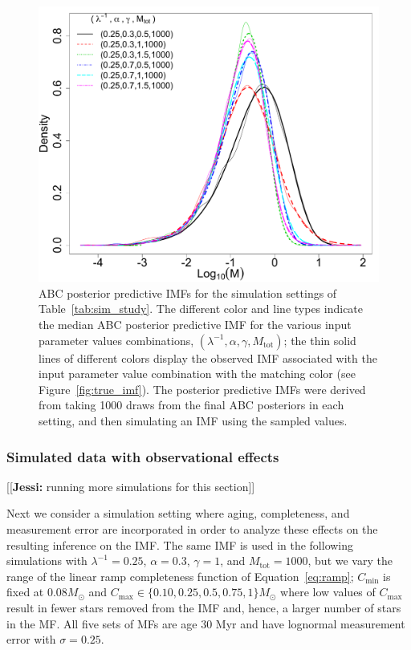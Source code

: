 \documentclass[12pt]{article}
\newcommand{\jessi}[1]{{\color{blue}[[\textbf{Jessi: }#1]]}}
\newcommand{\Msun}{M_{\odot}}
\newcommand{\Cmin}{C_{\text{min}}}
\newcommand{\Cmax}{C_{\text{max}}}
\newcommand{\Mtot}{M_{\text{tot}}}
\begin{document}
\begin{figure}[htbp]
   \centering
\includegraphics[width = .5\textwidth]{figures/sim_study_imf_combined.pdf} 
   \caption{ABC posterior predictive IMFs for the simulation settings of Table~\ref{tab:sim_study}.  The different color and line types indicate the median ABC posterior predictive IMF for the various input parameter values combinations, $(\lambda^{-1}, \alpha, \gamma, \Mtot)$; the thin solid lines of different colors display the observed IMF associated with the input parameter value combination with the matching color (see Figure~\ref{fig:true_imf}).
The posterior predictive IMFs were derived from taking 1000 draws from the final ABC posteriors in each setting, and then simulating an IMF using the sampled values. 
   }
   \label{fig:abc_pa_imf}
\end{figure}





\subsubsection{Simulated data with observational effects} \label{sec:sim_obs}

\jessi{running more simulations for this section}

Next we consider a simulation setting where aging, completeness, and measurement error are incorporated in order to analyze these effects on the resulting inference on the IMF.  The same IMF is used in the following simulations with $\lambda^{-1} = 0.25$, $\alpha = 0.3$, $\gamma = 1$, and $\Mtot = 1000$, but we vary the range of the linear ramp completeness function of Equation~\eqref{eq:ramp}; $\Cmin$ is fixed at 0.08$\Msun$ and $\Cmax \in \{0.10, 0.25, 0.5, 0.75, 1\} \Msun$ where low values of $\Cmax$ result in fewer stars removed from the IMF and, hence, a larger number of stars in the MF.  All five sets of MFs are age 30 Myr and have lognormal measurement error with $\sigma = 0.25$.  
\end{document}
